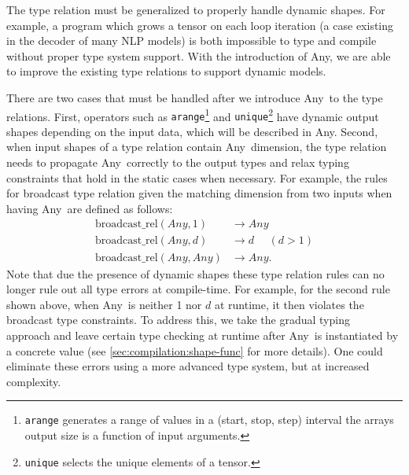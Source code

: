 The type relation must be generalized to properly handle dynamic shapes. For example, a program which grows a tensor on each loop iteration (a case existing in the decoder of many NLP models) is both impossible to type and compile without proper type system support. With the introduction of Any, we are able to improve the existing type relations to support dynamic models.

There are two cases that must be handled after we introduce Any~to the type relations.
First, operators such as {\tt arange}\footnote{{\tt arange} generates a range of values in a (start, stop, step) interval the arrays output size is a function of input arguments.} and {\tt unique}\footnote{{\tt unique} selects the unique elements of a tensor.} have dynamic output shapes depending on the input data, which will be described in Any.
Second, when input shapes of a type relation contain Any~dimension, the type relation needs to propagate Any~correctly to the output types and relax typing constraints that hold in the static cases when necessary.
For example, the rules
for broadcast type relation given the matching dimension from two inputs when having Any~are defined as follows:
\begin{align*}
  \textrm{broadcast\_rel}(Any, 1) &\rightarrow Any \\
  \textrm{broadcast\_rel}(Any, d) &\rightarrow d ~~~~~~(d > 1) \\
  \textrm{broadcast\_rel}(Any, Any) &\rightarrow Any.
\end{align*}
Note that due the presence of dynamic shapes these type relation rules can no longer rule out all type errors at compile-time.
For example, for the second rule shown above, when Any~is neither 1 nor $d$ at runtime, it then violates the broadcast type constraints.
To address this, we take the gradual typing~\citep{gradualtyping} approach and leave certain type checking at runtime after Any~is instantiated by a
concrete value (see \autoref{sec:compilation:shape-func} for more details).
One could eliminate these errors using a more advanced type system, but at increased complexity.

